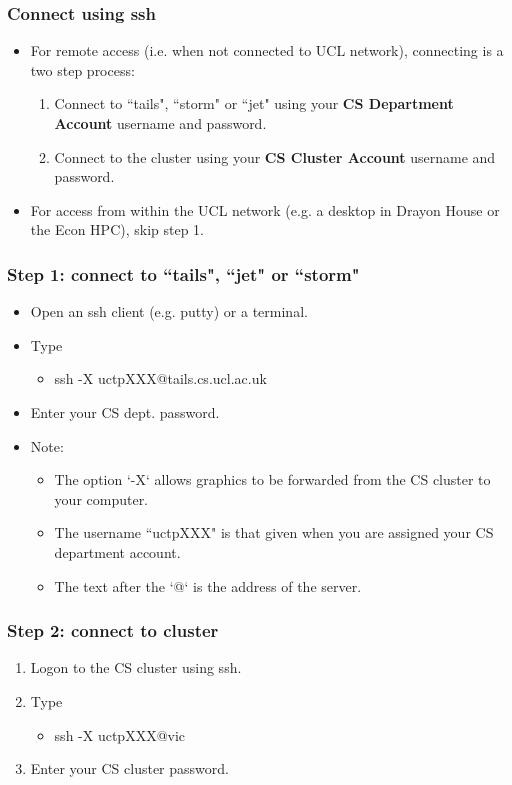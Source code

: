 \documentclass{beamer}
\begin{document}
\begin{frame}
\frametitle{Connect using ssh}
\begin{itemize}
\item For remote access (i.e. when not connected to UCL network), connecting is a two step process:
\begin{enumerate}
\item Connect to ``tails", ``storm" or ``jet" using your \textbf{CS Department Account} username and password.
\item Connect to the cluster using your \textbf{CS Cluster Account} username and password.
\end{enumerate}
\item For access from within the UCL network (e.g. a desktop in Drayon House or the Econ HPC), skip step 1.
\end{itemize}
\end{frame}

\begin{frame}
\frametitle{Step 1: connect to ``tails", ``jet" or ``storm"}
\begin{itemize}
\item Open an ssh client (e.g. putty) or a terminal.
\item Type
\begin{itemize}
\item ssh -X uctpXXX@tails.cs.ucl.ac.uk
\end{itemize} 
\item Enter your CS dept. password.
\item Note:
\begin{itemize}
\item The option `-X` allows graphics to be forwarded from the CS cluster to your computer.
\item The username ``uctpXXX" is that given when you are assigned your CS department account.
\item The text after the `@` is the address of the server.
\end{itemize}
\end{itemize}
\end{frame}

\begin{frame}
\frametitle{Step 2: connect to cluster}
\begin{enumerate}
\item Logon to the CS cluster using ssh.
\item Type 
\begin{itemize}
\item ssh -X uctpXXX@vic
\end{itemize}
\item Enter your CS cluster password.
\end{enumerate}
\end{frame}
\end{document}
